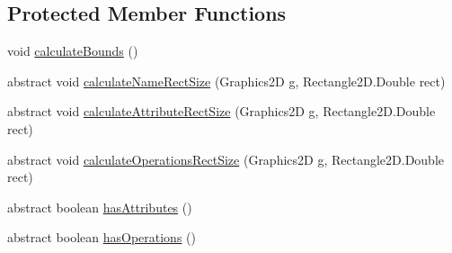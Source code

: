 \subsection*{Protected Member Functions}
\begin{DoxyCompactItemize}
\item 
void \hyperlink{classorg_1_1tzi_1_1use_1_1gui_1_1views_1_1diagrams_1_1classdiagram_1_1_classifier_node_a8d3d12ab089bef1638dc78479a261f5e}{calculate\-Bounds} ()
\item 
abstract void \hyperlink{classorg_1_1tzi_1_1use_1_1gui_1_1views_1_1diagrams_1_1classdiagram_1_1_classifier_node_a3f045a80e80e92edc11877fdfa244472}{calculate\-Name\-Rect\-Size} (Graphics2\-D g, Rectangle2\-D.\-Double rect)
\item 
abstract void \hyperlink{classorg_1_1tzi_1_1use_1_1gui_1_1views_1_1diagrams_1_1classdiagram_1_1_classifier_node_ac9f4ee58c7b2f52b77dd965ab68c5a81}{calculate\-Attribute\-Rect\-Size} (Graphics2\-D g, Rectangle2\-D.\-Double rect)
\item 
abstract void \hyperlink{classorg_1_1tzi_1_1use_1_1gui_1_1views_1_1diagrams_1_1classdiagram_1_1_classifier_node_a868cb1b4630013fa80f317668a46c15e}{calculate\-Operations\-Rect\-Size} (Graphics2\-D g, Rectangle2\-D.\-Double rect)
\item 
abstract boolean \hyperlink{classorg_1_1tzi_1_1use_1_1gui_1_1views_1_1diagrams_1_1classdiagram_1_1_classifier_node_a2576803178f0c6560e4824320b4f5fe0}{has\-Attributes} ()
\item 
abstract boolean \hyperlink{classorg_1_1tzi_1_1use_1_1gui_1_1views_1_1diagrams_1_1classdiagram_1_1_classifier_node_afcc5ebf211153cfa302b74ac95df27bd}{has\-Operations} ()
\end{DoxyCompactItemize}
